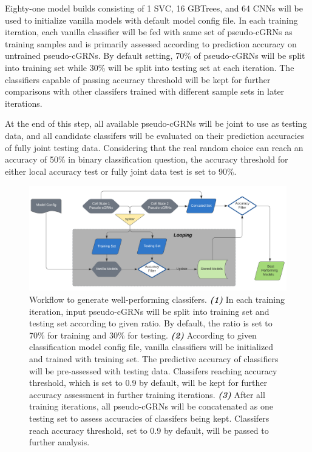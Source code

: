 \documentclass[fleqn,10pt]{wlscirep}
\begin{document}
Eighty-one model builds consisting of 1 SVC, 16 GBTrees, and 64 CNNs will be used to initialize vanilla models with default model config file.
In each training iteration, each vanilla classifier will be fed with same set of pseudo-cGRNs as training samples and is primarily assessed according to prediction accuracy on untrained pseudo-cGRNs.
By default setting, 70\% of pseudo-cGRNs will be split into training set while 30\% will be split into testing set at each iteration.
The classifiers capable of passing accuracy threshold will be kept for further comparisons with other classifers trained with different sample sets in later iterations.

At the end of this step, all available pseudo-cGRNs will be joint to use as testing data, and all candidate classifers will be evaluated on their prediction accuracies of fully joint testing data.
Considering that the real random choice can reach an accuracy of 50\% in binary classification question, the accuracy threshold for either local accuracy test or fully joint data test is set to 90\%.

\begin{figure}[ht]
\centering
\includegraphics[width=1.0\linewidth]{image/Odysseus.png}
\caption{
Workflow to generate well-performing classifers.
\textbf{\emph{(1)}} In each training iteration, input pseudo-cGRNs will be split into training set and testing set according to given ratio.
By default, the ratio is set to 70\% for training and 30\% for testing.
\textbf{\emph{(2)}} According to given classification model config file, vanilla classifiers will be initialized and trained with training set.
The predictive accuracy of classifiers will be pre-assessed with testing data.
Classifers reaching accuracy threshold, which is set to 0.9 by default, will be kept for further accuracy assessment in further training iterations.
\textbf{\emph{(3)}} After all training iterations, all pseudo-cGRNs will be concatenated as one testing set to assess accuracies of classifers being kept.
Classifers reach accuracy threshold, set to 0.9 by default, will be passed to further analysis.
}
\label{odysseus}
\end{figure}
\end{document}
